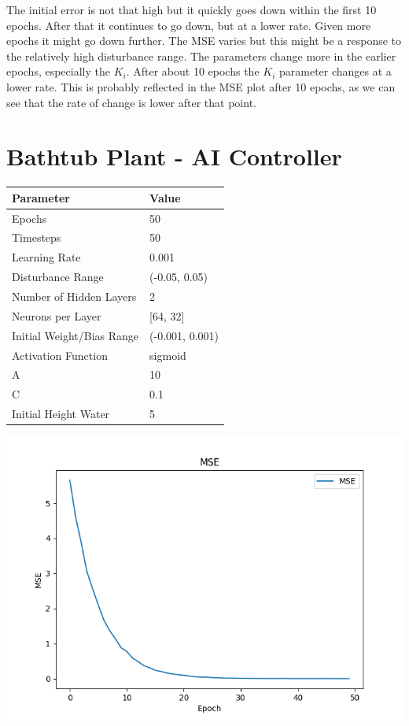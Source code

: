 \documentclass[12pt]{article}
\begin{document}
The initial error is not that high but it quickly goes down within the first 10 epochs. After that it continues
to go down, but at a lower rate. Given more epochs it might go down further. The MSE varies but this might be a response
to the relatively high disturbance range. The parameters change more in the earlier epochs, especially the $K_i$. After about
10 epochs the $K_i$ parameter changes at a lower rate. This is probably reflected in the MSE plot after 10 epochs, as we
can see that the rate of change is lower after that point.

\section*{Bathtub Plant - AI Controller}

\begin{tabular}{|l|l|}
    \hline
    \textbf{Parameter}   & \textbf{Value}\\ \hline
    Epochs               & 50            \\ \hline
    Timesteps            & 50            \\ \hline
    Learning Rate        & 0.001          \\ \hline
    Disturbance Range    & (-0.05, 0.05) \\ \hline
    Number of Hidden Layers           & 2           \\ \hline
    Neurons per Layer           & [64, 32]           \\ \hline
    Initial Weight/Bias Range           & (-0.001, 0.001)           \\ \hline
    Activation Function                    & sigmoid            \\ \hline
    A                    & 10           \\ \hline
    C & 0.1             \\ \hline
    Initial Height Water & 5             \\ \hline
\end{tabular}
    
\begin{center}
    \includegraphics[width=0.8\linewidth]{figures/bathtub-ai.png}
\end{center}
\end{document}
